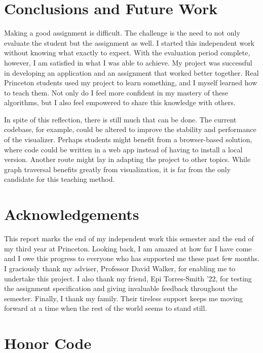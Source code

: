 \documentclass[pageno]{jpaper}
\begin{document}
\section{Conclusions and Future Work}

Making a good assignment is difficult. The challenge is the need to not only evaluate the student but the assignment as well. I started this independent work without knowing what exactly to expect. With the evaluation period complete, however, I am satisfied in what I was able to achieve. My project was successful in developing an application and an assignment that worked better together. Real Princeton students used my project to learn something, and I myself learned how to teach them. Not only do I feel more confident in my mastery of these algorithms, but I also feel empowered to share this knowledge with others.

In spite of this reflection, there is still much that can be done. The current codebase, for example, could be altered to improve the stability and performance of the visualizer. Perhaps students might benefit from a browser-based solution, where code could be written in a web app instead of having to install a local version. Another route might lay in adapting the project to other topics. While graph traversal benefits greatly from visualization, it is far from the only candidate for this teaching method.

\pagebreak

\section*{Acknowledgements}

This report marks the end of my independent work this semester and the end of my third year at Princeton. Looking back, I am amazed at how far I have come and I owe this progress to everyone who has supported me these past few months. I graciously thank my adviser, Professor David Walker, for enabling me to undertake this project. I also thank my friend, Epi Torres-Smith '22, for testing the assignment specification and giving invaluable feedback throughout the semester. Finally, I thank my family. Their tireless support keeps me moving forward at a time when the rest of the world seems to stand still.

\section*{Honor Code}
\end{document}
